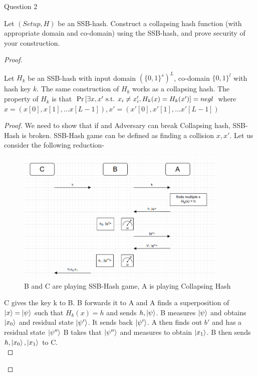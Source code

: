 \begin{solution}{Question 2}\label{ques:2}
    \begin{question}
    Let $(Setup, H)$ be an SSB-hash. Construct a collapsing hash function (with appropriate domain and co-domain) using the SSB-hash, and prove security of your construction.
    \end{question}
    \tcblower{}
    \begin{proof}
    \begin{claim}
        Let $H_k$ be an SSB-hash with input domain $(\{0,1\}^s)^L$, co-domain $\{0,1\}^l$ with hash key $k$. The same construction of $H_k$ works as a collapsing hash. The property of $H_k$ is that $\Pr\left[ \exists x,x' \text{ s.t. } x_i \neq x'_i, H_k(x) = H_k(x') \right] = negl$ where $x = (x[0], x[1], \ldots x[L-1]), x' = (x'[0], x'[1], \ldots x'[L-1])$
    \end{claim}
    \begin{proof}
        We need to show that if and Adversary can break Collapsing hash, SSB-Hash is broken. SSB-Hash game can be defined as finding a collision $x,x'$. Let us consider the following reduction-
        \begin{figure}[H]
            \centering
            \includegraphics[width = 0.9\textwidth]{image.png}
            \caption{B and C are playing SSB-Hash game, A is playing Collapsing Hash}
            \label{fig:q2}
        \end{figure}
        C gives the key k to B. B forwards it to A and A finds a superposition of $\ket{x} = \ket{\psi}$ such that $H_k(x) = h$ and sends $h, \ket{\psi}$. B measures $\ket{\psi}$ and obtains $\ket{x_0}$ and residual state $\ket{\psi'}$. It sends back $\ket{\psi'}$. A then finds out $b'$ and has a residual state $\ket{\psi''}$ B takes that $\ket{\psi''}$ and measures to obtain $\ket{x_1}$. B then sends $h, \ket{x_0}, \ket{x_1}$ to C.\\

\end{proof}
\end{proof}
\end{solution}
